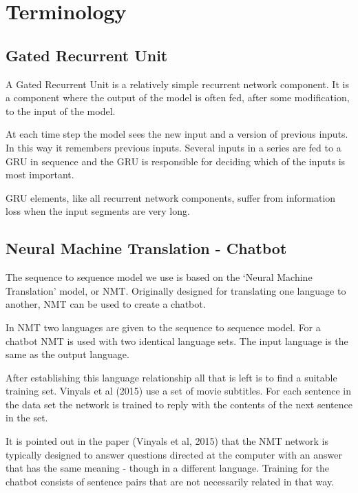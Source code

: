 \chapter{Terminology}

\section{Gated Recurrent Unit}

A Gated Recurrent Unit is a relatively simple recurrent network component. It is a component 
where the output of the model is often fed, after some modification, to the input of the model. 

At each time step the model sees the new input and a version of previous inputs. In this
way it remembers previous inputs. Several inputs in a series are fed to a GRU in sequence and the GRU is responsible for deciding which of the inputs is most important.

GRU elements, like all recurrent network components, suffer from information loss when the input segments are very long.

\section{Neural Machine Translation - Chatbot}

The sequence to sequence model we use is based on the \textquoteleft Neural
Machine Translation\textquoteright{} model, or \ac{NMT}. Originally designed
for translating one language to another, NMT can be used to create
a chatbot.

In NMT two languages are given to the sequence to sequence model.
For a chatbot NMT is used with two identical language sets. The input
language is the same as the output language.

After establishing this language relationship all that is left is
to find a suitable training set. Vinyals et al (2015)\cite{DBLP:journals/corr/VinyalsL15}
use a set of movie subtitles. For each sentence in the data set the
network is trained to reply with the contents of the next sentence
in the set.

It is pointed out in the paper (Vinyals et al, 2015)\cite{DBLP:journals/corr/VinyalsL15}
that the NMT network is typically designed to answer questions directed
at the computer with an answer that has the same meaning - though
in a different language. Training for the chatbot consists of sentence
pairs that are not necessarily related in that way. 

